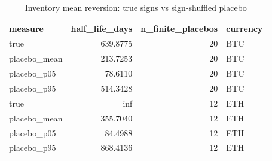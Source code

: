 \begin{table}
\caption{Inventory mean reversion: true signs vs sign-shuffled placebo}
\label{tab:t2b_signing_test}
\begin{tabular}{lrrl}
\toprule
measure & half\_life\_days & n\_finite\_placebos & currency \\
\midrule
true & 639.8775 & 20 & BTC \\
placebo\_mean & 213.7253 & 20 & BTC \\
placebo\_p05 & 78.6110 & 20 & BTC \\
placebo\_p95 & 514.3428 & 20 & BTC \\
true & inf & 12 & ETH \\
placebo\_mean & 355.7040 & 12 & ETH \\
placebo\_p05 & 84.4988 & 12 & ETH \\
placebo\_p95 & 868.4136 & 12 & ETH \\
\bottomrule
\end{tabular}
\end{table}
